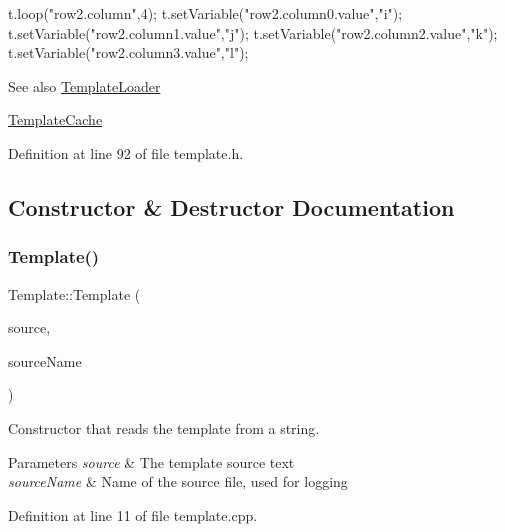 {\ttfamily 
\begin{DoxyPre}t.loop("row2.column",4);
t.setVariable("row2.column0.value","i");
t.setVariable("row2.column1.value","j");
t.setVariable("row2.column2.value","k");
t.setVariable("row2.column3.value","l");
\end{DoxyPre}
}

\begin{DoxySeeAlso}{See also}
\mbox{\hyperlink{classstefanfrings_1_1_template_loader}{Template\+Loader}} 

\mbox{\hyperlink{classstefanfrings_1_1_template_cache}{Template\+Cache}} 
\end{DoxySeeAlso}


Definition at line 92 of file template.\+h.



\subsection{Constructor \& Destructor Documentation}
\mbox{\label{classstefanfrings_1_1_template_a2789cca9bf2ed506cbf36ee21614c96f}} 
\subsubsection{\texorpdfstring{Template()}{Template()}\hspace{0.1cm}{\footnotesize\ttfamily [1/2]}}
{\footnotesize\ttfamily Template\+::\+Template (\begin{DoxyParamCaption}\item[{Q\+String}]{source,  }\item[{Q\+String}]{source\+Name }\end{DoxyParamCaption})}

Constructor that reads the template from a string. 
\begin{DoxyParams}{Parameters}
{\em source} & The template source text \\
\hline
{\em source\+Name} & Name of the source file, used for logging \\
\hline
\end{DoxyParams}


Definition at line 11 of file template.\+cpp.

\mbox{\label{classstefanfrings_1_1_template_a43eee8fe07463d0af6aeb8db3ebd8174}} 
